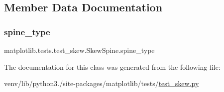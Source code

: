 \subsection{Member Data Documentation}
\mbox{\label{classmatplotlib_1_1tests_1_1test__skew_1_1SkewSpine_ae576658da51536a99f0075dc32221992}} 
\subsubsection{\texorpdfstring{spine\+\_\+type}{spine\_type}}
{\footnotesize\ttfamily matplotlib.\+tests.\+test\+\_\+skew.\+Skew\+Spine.\+spine\+\_\+type}



The documentation for this class was generated from the following file\+:\begin{DoxyCompactItemize}
\item 
venv/lib/python3./site-\/packages/matplotlib/tests/\hyperlink{test__skew_8py}{test\+\_\+skew.\+py}\end{DoxyCompactItemize}
